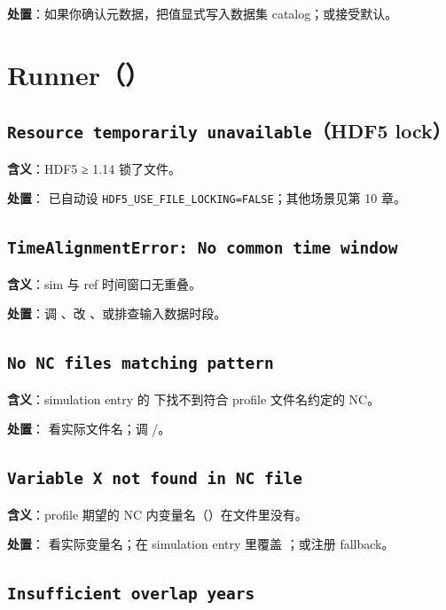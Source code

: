 \textbf{处置}：如果你确认元数据，把值显式写入数据集 catalog；或接受默认。

\section{Runner（）}

\subsection{\texttt{Resource temporarily unavailable}（HDF5 lock）}

\textbf{含义}：HDF5 ≥ 1.14 锁了文件。

\textbf{处置}： 已自动设 \texttt{HDF5\_USE\_FILE\_LOCKING=FALSE}；其他场景见第 10 章。

\subsection{\texttt{TimeAlignmentError: No common time window}}

\textbf{含义}：sim 与 ref 时间窗口无重叠。

\textbf{处置}：调 、改 、或排查输入数据时段。

\subsection{\texttt{No NC files matching pattern}}

\textbf{含义}：simulation entry 的  下找不到符合 profile 文件名约定的 NC。

\textbf{处置}： 看实际文件名；调 /。

\subsection{\texttt{Variable X not found in NC file}}

\textbf{含义}：profile 期望的 NC 内变量名（）在文件里没有。

\textbf{处置}： 看实际变量名；在 simulation entry 里覆盖 ；或注册 fallback。

\subsection{\texttt{Insufficient overlap years}}

